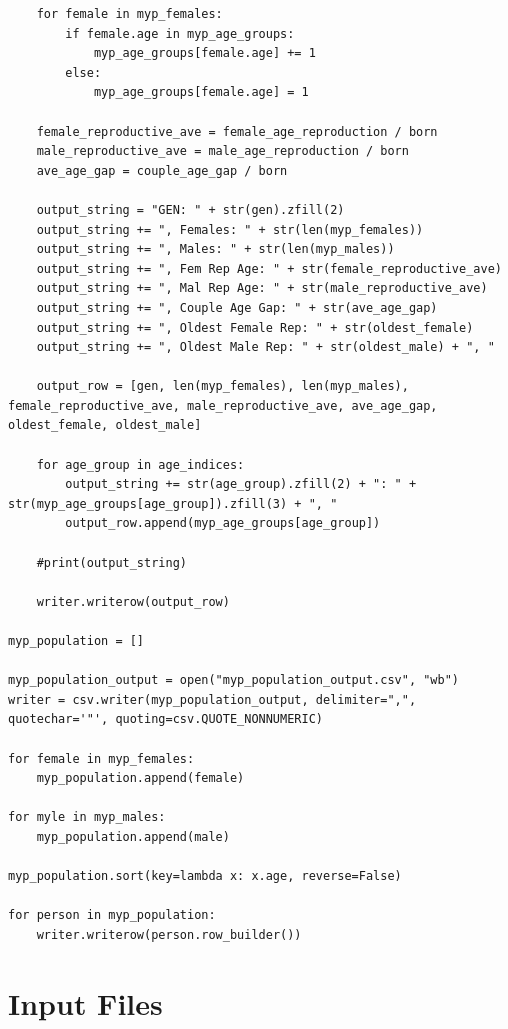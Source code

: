 \documentclass[authoryearcitations]{UoYCSproject}
\begin{document}
\begin{landscape}
\begin{verbatim}
    for female in myp_females:
        if female.age in myp_age_groups:
            myp_age_groups[female.age] += 1
        else:
            myp_age_groups[female.age] = 1

    female_reproductive_ave = female_age_reproduction / born
    male_reproductive_ave = male_age_reproduction / born
    ave_age_gap = couple_age_gap / born

    output_string = "GEN: " + str(gen).zfill(2)
    output_string += ", Females: " + str(len(myp_females))
    output_string += ", Males: " + str(len(myp_males))
    output_string += ", Fem Rep Age: " + str(female_reproductive_ave)
    output_string += ", Mal Rep Age: " + str(male_reproductive_ave)
    output_string += ", Couple Age Gap: " + str(ave_age_gap)
    output_string += ", Oldest Female Rep: " + str(oldest_female)
    output_string += ", Oldest Male Rep: " + str(oldest_male) + ", "

    output_row = [gen, len(myp_females), len(myp_males), female_reproductive_ave, male_reproductive_ave, ave_age_gap, oldest_female, oldest_male]

    for age_group in age_indices:
        output_string += str(age_group).zfill(2) + ": " +  str(myp_age_groups[age_group]).zfill(3) + ", "
        output_row.append(myp_age_groups[age_group])

    #print(output_string)

    writer.writerow(output_row)

myp_population = []

myp_population_output = open("myp_population_output.csv", "wb")
writer = csv.writer(myp_population_output, delimiter=",", quotechar='"', quoting=csv.QUOTE_NONNUMERIC)

for female in myp_females:
    myp_population.append(female)

for myle in myp_males:
    myp_population.append(male)

myp_population.sort(key=lambda x: x.age, reverse=False)

for person in myp_population:
    writer.writerow(person.row_builder())
\end{verbatim}
\end{landscape}

\chapter{Input Files}
\end{document}
